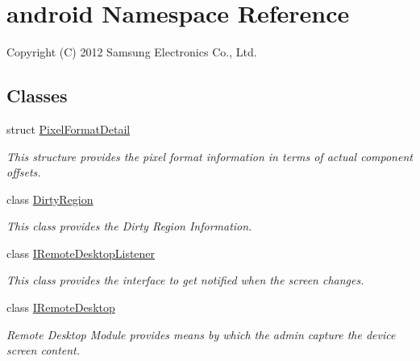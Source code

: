 \hypertarget{namespaceandroid}{\section{android \-Namespace \-Reference}
\label{namespaceandroid}
}


\-Copyright (\-C) 2012 \-Samsung \-Electronics \-Co., \-Ltd.  


\subsection*{\-Classes}
\begin{DoxyCompactItemize}
\item 
struct \hyperlink{structandroid_1_1PixelFormatDetail}{\-Pixel\-Format\-Detail}
\begin{DoxyCompactList}\small\item\em \-This structure provides the pixel format information in terms of actual component offsets. \end{DoxyCompactList}\item 
class \hyperlink{classandroid_1_1DirtyRegion}{\-Dirty\-Region}
\begin{DoxyCompactList}\small\item\em \-This class provides the \-Dirty \-Region \-Information. \end{DoxyCompactList}\item 
class \hyperlink{classandroid_1_1IRemoteDesktopListener}{\-I\-Remote\-Desktop\-Listener}
\begin{DoxyCompactList}\small\item\em \-This class provides the interface to get notified when the screen changes. \end{DoxyCompactList}\item 
class \hyperlink{classandroid_1_1IRemoteDesktop}{\-I\-Remote\-Desktop}
\begin{DoxyCompactList}\small\item\em \-Remote \-Desktop \-Module provides means by which the admin capture the device screen content. \end{DoxyCompactList}\end{DoxyCompactItemize}
